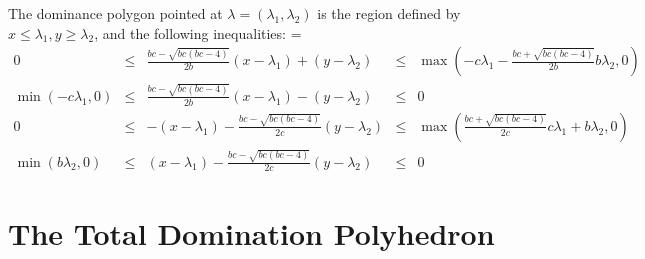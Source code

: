 \documentclass{amsart}
\numberwithin{theorem}{section}
\begin{document}
  The dominance polygon pointed at $\lambda=(\lambda_1,\lambda_2)$ is the region defined by $x\leq \lambda_1, y\geq\lambda_2$, and the following inequalities:
 {
    \everymath={\displaystyle}
    \def\arraystretch{2.8}
  \[
  \begin{array}{rcccl}
    0 & \leq & \frac{b c-\sqrt{b c (b c-4)}}{2 b}(x-\lambda_1)+(y-\lambda_2) & \leq & \max\left(-c\lambda_1-\frac{b c+\sqrt{b c (b c-4)}}{2b}b\lambda_2,0\right)
    \\
    \min\left(-c\lambda_1,0\right) & \leq & \frac{b c-\sqrt{b c (b c-4)}}{2 b}(x-\lambda_1)-(y-\lambda_2) & \leq & 0
    \\
    0 & \leq &  -(x-\lambda_1)-\frac{b c-\sqrt{b c (b c-4)}}{2 c}(y-\lambda_2) & \leq & \max\left(\frac{b c+\sqrt{b c (b c-4)}}{2c}c\lambda_1+b\lambda_2,0\right)
    \\
    \min\left(b \lambda_2,0\right) & \leq & (x-\lambda_1) - \frac{b c-\sqrt{b c (b c-4)}}{2 c} (y-\lambda_2) & \leq & 0
  \end{array}
\]
}

\section{The Total Domination Polyhedron}
\end{document}
